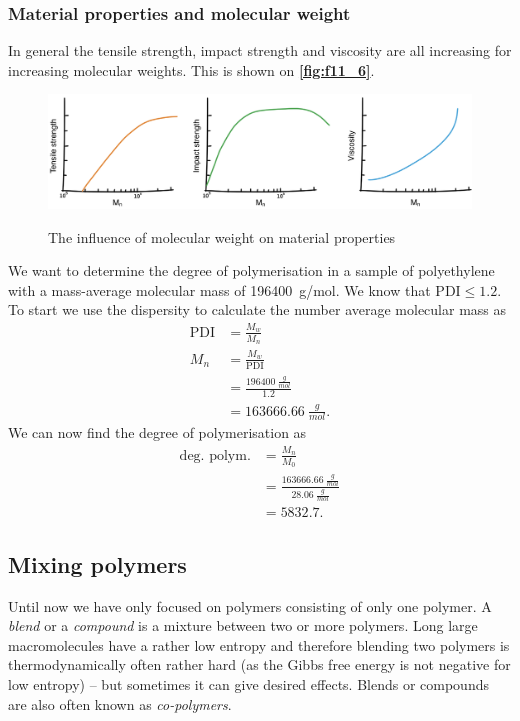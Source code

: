 \subsubsection{Material properties and molecular weight}
In general the tensile strength, impact strength and viscosity are all increasing for increasing molecular weights. This is shown on \textbf{\autoref{fig:f11_6}}.
\begin{figure} [ht]
  \centering
  \caption{The influence of molecular weight on material properties}
  \includegraphics[width=0.75\linewidth]{./figures/f11_6.png}
  \label{fig:f11_6}
\end{figure}

\begin{exa}
  We want to determine the degree of polymerisation in a sample of polyethylene with a mass-average molecular mass of \qty{196400}{g/mol}. We know that $\mathrm{PDI} \leq \num{1,2}$.
  \bigbreak
  To start we use the dispersity to calculate the number average molecular mass as
  \begin{align*}
    \mathrm{PDI} &= \frac{M_w}{M_n} \\
    M_n &= \frac{M_w}{\mathrm{PDI}} \\
    &= \frac{\qty{196400}{\frac{g}{mol}}}{\num{1,2}} \\
    &= \qty{163666,66}{\frac{g}{mol}} 
  .\end{align*}
  We can now find the degree of polymerisation as
  \begin{align*}
    \text{deg. polym.} &= \frac{M_n}{M_0} \\
    &= \frac{\qty{163666,66}{\frac{g}{mol}}}{\qty{28,06}{\frac{g}{mol}} } \\
    &= \num{5832,7} 
  .\end{align*}
\end{exa}

\subsection{Mixing polymers}
Until now we have only focused on polymers consisting of only one polymer. A \textit{blend} or a \textit{compound} is a mixture between two or more polymers. Long large macromolecules have a rather low entropy and therefore blending two polymers is thermodynamically often rather hard (as the Gibbs free energy is not negative for low entropy) -- but sometimes it can give desired effects. Blends or compounds are also often known as \textit{co-polymers}.

